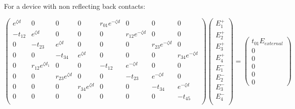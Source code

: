 For a device with non reflecting back contacts:

$
 \begin{pmatrix}
  e^{\zeta d}         & 0                   & 0                  & 0                   &r_{01}e^{-\zeta d}     & 0                       & 0                    & 0   \\
  -t_{12}              & e^{\zeta d}        & 0                  & 0                   &0                     & r_{12}e^{-\zeta d}      & 0                   & 0    \\
  0                    & -t_{23}             & e^{\zeta d}       & 0			&0                     & 0                      & r_{23}e^{-\zeta d}   & 0    \\
  0                    & 0                   & -t_{34}            & e^{\zeta d}	& 0			& 0                      & 0                   & r_{34}e^{-\zeta d} \\
  0                    &r_{12}e^{\zeta d_1} & 0                   & 0                  & -t_{12}			&e^{-\zeta d}           & 0                      & 0       \\
  0                    &0                    & r_{23}e^{\zeta d}  & 0                  & 0                     	   &-t_{23}                & e^{-\zeta d}           & 0    \\
  0                    &0                    & 0                   & r_{34}e^{\zeta d} & 0     			   &0                     & -t_{34}                & e^{-\zeta d}    \\
  0                    &0                    & 0                   & 0		  	& 0				   &0                     & 0			   & -t_{45}        \\
 \end{pmatrix}
\begin{pmatrix}
  E_{1}^{+} \\
  E_{2}^{+} \\
  E_{3}^{+}  \\
  E_{4}^{+} \\
  E_{1}^{-} \\
  E_{2}^{-} \\
  E_{3}^{-}  \\
  E_{4}^{-}  \\
 \end{pmatrix}
=
\begin{pmatrix}
  t_{01}E_{external} \\
  0 \\
  0 \\
  0 \\
  0 \\
  0 
 \end{pmatrix}
$

